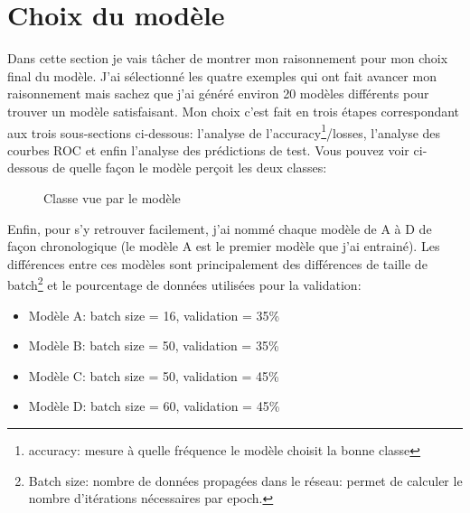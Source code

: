 \documentclass[a4paper,12pt]{report}
\begin{document}
    \section{Choix du modèle}    
      Dans cette section je vais tâcher de montrer mon raisonnement pour mon choix final du modèle. J'ai sélectionné les quatre exemples qui ont fait avancer mon raisonnement mais sachez que j'ai généré environ 20 modèles différents pour trouver un modèle satisfaisant.
      \medbreak
      Mon choix c'est fait en trois étapes correspondant aux trois sous-sections ci-dessous: l'analyse de l'accuracy\footnote{accuracy: mesure à quelle fréquence le modèle choisit la bonne classe}/losses, l'analyse des courbes ROC et enfin l'analyse des prédictions de test.
      \medbreak
      Vous pouvez voir ci-dessous de quelle façon le modèle perçoit les deux classes: 
      \begin{figure}[!h]%
        \centering
        \qquad
        \qquad
        \caption{Classe vue par le modèle}%
      \end{figure}%
      \bigbreak
      Enfin, pour s'y retrouver facilement, j'ai nommé chaque modèle de A à D de façon chronologique (le modèle A est le premier modèle que j'ai entrainé). Les différences entre ces modèles sont principalement des différences de taille de batch\footnote{Batch size: nombre de données propagées dans le réseau: permet de calculer le nombre d'itérations nécessaires par epoch.} et le pourcentage de données utilisées pour la validation:
      \begin{itemize}
        \item Modèle A: batch size = 16, validation = 35\%
        \item Modèle B: batch size = 50, validation = 35\%
        \item Modèle C: batch size = 50, validation = 45\%
        \item Modèle D: batch size = 60, validation = 45\%
      \end{itemize}
\end{document}

